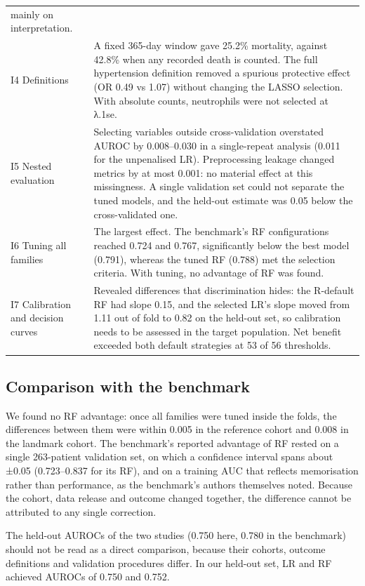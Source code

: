 \begin{longtable}[]{@{}
  >{\raggedright\arraybackslash}p{}
  >{\raggedright\arraybackslash}p{}@{}}
mainly on interpretation. \\
I4 Definitions & A fixed 365-day window gave 25.2\% mortality, against 42.8\%
when any recorded death is counted. The full hypertension definition removed a
spurious protective effect (OR 0.49 vs 1.07) without changing the LASSO
selection. With absolute counts, neutrophils were not selected at λ.1se. \\
I5 Nested evaluation & Selecting variables outside cross-validation overstated
AUROC by 0.008--0.030 in a single-repeat analysis (0.011 for the unpenalised
LR). Preprocessing leakage changed metrics by at most 0.001: no material effect
at this missingness. A single validation set could not separate the tuned
models, and the held-out estimate was 0.05 below the cross-validated one. \\
I6 Tuning all families & The largest effect. The benchmark's RF configurations
reached 0.724 and 0.767, significantly below the best model (0.791), whereas the
tuned RF (0.788) met the selection criteria. With tuning, no advantage of RF was
found. \\
I7 Calibration and decision curves & Revealed differences that discrimination
hides: the R-default RF had slope 0.15, and the selected LR's slope moved from
1.11 out of fold to 0.82 on the held-out set, so calibration needs to be
assessed in the target population. Net benefit exceeded both default strategies
at 53 of 56 thresholds. \\
\end{longtable}

\hypertarget{comparison-with-the-benchmark}{%
\subsection{Comparison with the benchmark}\label{comparison-with-the-benchmark}}

We found no RF advantage: once all families were tuned inside the folds, the
differences between them were within 0.005 in the reference cohort and 0.008 in
the landmark cohort. The benchmark's reported advantage of RF rested on a single
263-patient validation set, on which a confidence interval spans about ±0.05
(0.723--0.837 for its RF), and on a training AUC that reflects memorisation
rather than performance, as the benchmark's authors themselves noted. Because
the cohort, data release and outcome changed together, the difference cannot be
attributed to any single correction.

The held-out AUROCs of the two studies (0.750 here, 0.780 in the benchmark)
should not be read as a direct comparison, because their cohorts, outcome
definitions and validation procedures differ. In our held-out set, LR and RF
achieved AUROCs of 0.750 and 0.752.


